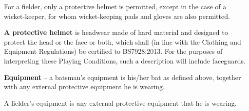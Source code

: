 \documentclass[12pt]{article}
\begin{document}
\vspace{\baselineskip}
\begin{adjustwidth}{0.49in}{0.14in}
{\fontsize{9pt}{10.8pt}\selectfont For a fielder, only a protective helmet is permitted, except in the case of a wicket-keeper, for whom wicket-keeping pads and gloves are also permitted.\par}\par

\end{adjustwidth}


\vspace{\baselineskip}
\begin{adjustwidth}{0.4in}{0.03in}
{\fontsize{9pt}{10.8pt} \tabto{0.39in} \textbf{A protective helmet }is headwear made of hard material and designed to protect the head or the face or both,\textbf{ }which shall (in line with the Clothing and Equipment Regulations) be certified to BS7928:2013. For the purposes of interpreting these Playing Conditions, such a description will include faceguards.\par}\par

\end{adjustwidth}


\vspace{\baselineskip}
\begin{adjustwidth}{0.4in}{0.21in}
{\fontsize{9pt}{10.8pt} \tabto{0.39in} \textbf{Equipment }– a batsman’s equipment is his/her bat\textbf{ }as defined above, together with any external protective\textbf{ }equipment he is wearing.\par}\par

\end{adjustwidth}


\vspace{\baselineskip}
\begin{adjustwidth}{0.49in}{0.0in}
{\fontsize{9pt}{10.8pt}\selectfont A fielder’s equipment is any external protective equipment that he is wearing.\par}\par

\end{adjustwidth}


\vspace{\baselineskip}

\vspace{\baselineskip}

\vspace{\baselineskip}
\end{document}
